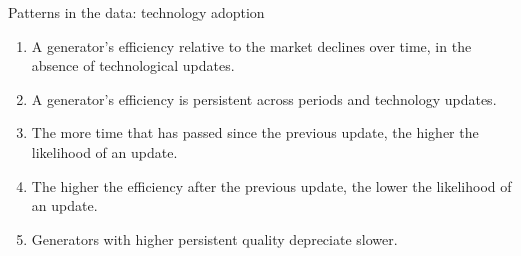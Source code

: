 \documentclass{beamer}
\begin{document}
\begin{frame}{Patterns in the data: technology adoption}\label{Facts}

\begin{enumerate}
\item A generator's efficiency relative to the market declines over time, in the absence of technological updates.
\item A generator's efficiency is persistent across periods and technology updates.
\item The more time that has passed since the previous update, the higher the likelihood of an update.
\item The higher the efficiency after the previous update, the lower the likelihood of an update.
\item Generators with higher persistent quality depreciate slower.

\end{enumerate}

\hyperlink{Data}{}
    
\end{frame}
\end{document}
